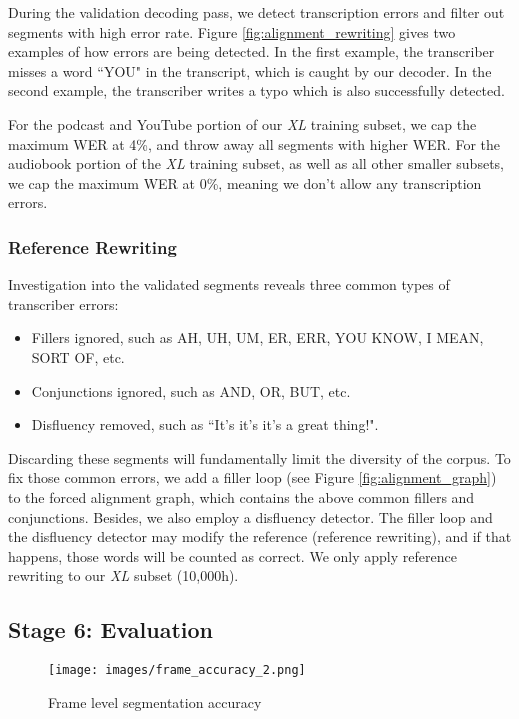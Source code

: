 \documentclass[a4paper]{article}
\begin{document}
During the validation decoding pass, we detect transcription errors and filter
out segments with high error rate. Figure \ref{fig:alignment_rewriting} gives
two examples of how errors are being detected. In the first example, the
transcriber misses a word ``YOU" in the transcript, which is caught by our
decoder. In the second example, the transcriber writes a typo which is also
successfully detected.

For the podcast and YouTube portion of our {\it XL} training subset, we cap the
maximum WER at 4\%, and throw away all segments with higher WER. For the
audiobook portion of the {\it XL} training subset, as well as all other smaller
subsets, we cap the maximum WER at 0\%, meaning we don't allow any transcription
errors.

\subsubsection{Reference Rewriting}
Investigation into the validated segments reveals three common types of transcriber errors:
\begin{itemize}
  \item Fillers ignored, such as AH, UH, UM, ER, ERR, YOU KNOW, I MEAN, SORT OF, etc.
  \item Conjunctions ignored, such as  AND, OR, BUT, etc.
  \item Disfluency removed, such as ``It's it's it's a great thing!".
\end{itemize}

Discarding these segments will fundamentally limit the diversity of the corpus. To fix those common errors, we add a filler loop (see Figure \ref{fig:alignment_graph}) to the forced alignment graph, which contains the above common fillers and
conjunctions. Besides, we also employ a disfluency detector. The filler loop and the disfluency detector may modify the reference (reference rewriting), and if that happens, those words will be counted as correct. We only apply reference rewriting to our {\it XL} subset (10,000h).

\subsection{Stage 6: Evaluation}
\begin{figure}[t]
  \centering
  \texttt{[image: images/frame\_accuracy\_2.png]}
  \vspace{-4ex}
  \caption{Frame level segmentation accuracy}
  \vspace{-1ex}
  \label{fig:frame_accuracy}
\end{figure}
\end{document}

